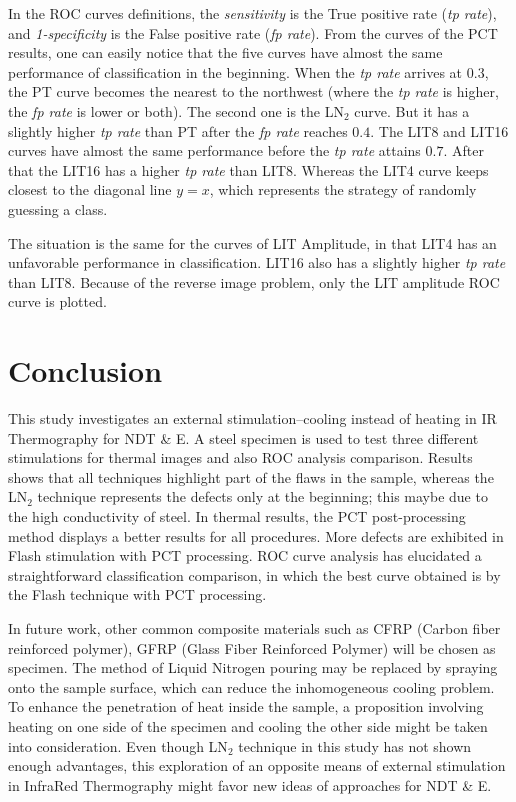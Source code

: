 \documentclass[]{spie}  %
\begin{document}
In the ROC curves definitions, the \textit{sensitivity} is the True positive rate (\textit{tp rate}), and \textit{1-specificity} is the False positive rate (\textit{fp rate}).
From the curves of the PCT results, one can easily notice that the five curves have almost the same performance of classification in the beginning. When the \textit{tp rate} arrives at $0.3$, the PT curve becomes the nearest to the northwest (where the \textit{tp rate} is higher, the \textit{fp rate} is lower or both). The second one is the LN$_2$ curve. But it has a slightly higher \textit{tp rate} than PT after the \textit{fp rate} reaches $0.4$. The LIT8 and LIT16 curves have almost the same performance before the \textit{tp rate} attains $0.7$. After that the LIT16 has a higher \textit{tp rate} than LIT8. Whereas the LIT4 curve keeps closest to the diagonal line $y=x$, which represents the strategy of randomly guessing a class.

The situation is the same for the curves of LIT Amplitude, in that LIT4 has an unfavorable performance in classification. LIT16 also has a slightly higher \textit{tp rate} than LIT8. Because of the reverse image problem, only the LIT amplitude ROC curve is plotted.



\section{Conclusion} %
\label{sec:conclusion}
This study investigates an external stimulation--cooling instead of heating in IR Thermography for NDT \& E. 
A steel specimen is used to test three different stimulations for thermal images and also ROC analysis comparison. 
Results shows that all techniques highlight part of the flaws in the sample, whereas the LN$_2$ technique represents the defects only at the beginning; this maybe due to the high conductivity of steel. 
In thermal results, the PCT post-processing method displays a better results for all procedures. More defects are exhibited in Flash stimulation with PCT processing.
ROC curve analysis has elucidated a straightforward classification comparison, in which the best curve obtained is by the Flash technique with PCT processing.

In future work, other common composite materials such as CFRP (Carbon fiber reinforced polymer), GFRP (Glass Fiber Reinforced Polymer) will be chosen as specimen. The method of Liquid Nitrogen pouring may be replaced by spraying onto the sample surface, which can reduce the inhomogeneous cooling problem. To enhance the penetration of heat inside the sample, a proposition involving heating on one side of the specimen and cooling the other side might be taken into consideration.
Even though LN$_2$ technique in this study has not shown enough advantages, this exploration of an opposite means of external stimulation in InfraRed Thermography might favor new ideas of approaches for NDT \& E.
\end{document}

